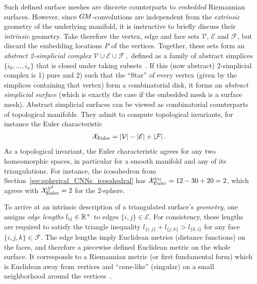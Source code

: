 Such defined surface meshes are discrete counterparts to \emph{embedded} Riemannian surfaces.
However, since $G\mkern-1.4muM$-convolutions are independent from the \emph{extrinsic} geometry of the underlying manifold, it is instructive to briefly discuss their \emph{intrinsic} geometry.
Take therefore the vertex, edge and face sets $\mathcal{V}$, $\mathcal{E}$ and $\mathcal{F}$, but discard the embedding locations $P$ of the vertices.
Together, these sets form an \emph{abstract 2-simplicial complex}
$\mathcal{V} \cup \mathcal{E} \cup \mathcal{F} \,,$
defined as a family of abstract simplices $\{i_0,\dots,i_n\}$ that is closed under taking subsets~\cite{craneDiscreteDifferentialGeometry2014}.
If this (now abstract) 2-simplicial complex is
1) pure and
2) such that the ``Star'' of every vertex (given by the simplices containing that vertex) form a combinatorial disk,
it forms an \emph{abstract simplicial surface} (which is exactly the case if the embedded mesh is a surface mesh).
Abstract simplicial surfaces can be viewed as combinatorial counterparts of topological manifolds.
They admit to compute topological invariants, for instance the Euler characteristic
\begin{align}
    \mathcal{X}_{\textup{Euler}} = |\mathcal{V}|-|\mathcal{E}|+|\mathcal{F}| \,.
\end{align}
As a topological invariant, the Euler characteristic agrees for any two homeomorphic spaces, in particular for a smooth manifold and any of its triangulations.
For instance, the icosahedron from Section~\ref{sec:spherical_CNNs_icosahedral} has $\mathcal{X}_{\textup{Euler}}^\textup{ico} = 12-30+20 = 2$, which agrees with $\mathcal{X}_{\textup{Euler}}^{S^2} = 2$ for the 2-sphere.


To arrive at an intrinsic description of a triangulated surface's \emph{geometry}, one assigns \emph{edge lengths} ${l_{ij} \in \mathbb{R}^+}$ to edges $\{i,j\} \in \mathcal{E}$.
For consistency, these lengths are required to satisfy the triangle inequality $l_{\{i,j\}} + l_{\{j,k\}} > l_{\{k,i\}}$ for any face $\{i,j,k\} \in \mathcal{F}$.
The edge lengths imply Euclidean metrics (distance functions) on the faces, and therefore a piecewise defined Euclidean metric on the whole surface.
It corresponds to a Riemannian metric (or first fundamental form) which is Euclidean away from vertices and ``cone-like'' (singular) on a small neighborhood around the vertices~\cite{Crane2020DiscreteConformalGeometry,desbrun2005DiscreteExteriorCalculus}.


